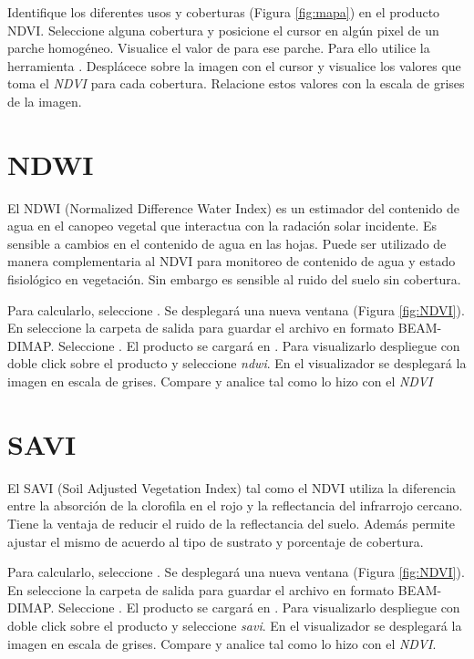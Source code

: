 Identifique los diferentes usos y coberturas (Figura \ref{fig:mapa}) en el producto NDVI. Seleccione alguna cobertura y posicione el cursor en algún pixel de un parche homogéneo. Visualice el valor de  para ese parche. Para ello utilice la herramienta  . Desplácece sobre la imagen con el cursor y visualice  los valores que toma el \emph{NDVI} para cada cobertura. Relacione estos valores con la escala de grises de la imagen. 


\section{NDWI}

El NDWI (Normalized Difference Water Index) es un estimador del contenido de agua en el canopeo vegetal que interactua con la radación solar incidente. Es sensible a cambios en el contenido de agua en las hojas. Puede ser utilizado de manera complementaria al NDVI para monitoreo de contenido de agua y estado fisiológico en vegetación. Sin embargo es sensible al ruido del suelo sin cobertura.

Para calcularlo, seleccione .  Se desplegará una nueva ventana (Figura \ref{fig:NDVI}). En  seleccione la carpeta de salida para guardar el archivo en formato BEAM-DIMAP. Seleccione . El producto  se cargará en . Para visualizarlo despliegue con doble click sobre el producto  y seleccione \emph {ndwi}. En el visualizador se desplegará la imagen en escala de grises. Compare y analice tal como lo hizo con el \emph{NDVI}

\section{SAVI}

El SAVI (Soil Adjusted Vegetation Index)  tal como el NDVI utiliza la diferencia entre la absorción de la clorofila en el rojo y la reflectancia del infrarrojo cercano. Tiene la ventaja de reducir el ruido de la reflectancia del suelo. Además permite ajustar el mismo de acuerdo al tipo de sustrato y porcentaje de cobertura. %

Para calcularlo, seleccione .  Se desplegará una nueva ventana (Figura \ref{fig:NDVI}). En  seleccione la carpeta de salida para guardar el archivo en formato BEAM-DIMAP. Seleccione . El producto  se cargará en . Para visualizarlo despliegue con doble click sobre el producto  y seleccione \emph {savi}. En el visualizador se desplegará la imagen en escala de grises. Compare y analice tal como lo hizo con el \emph{NDVI}.

